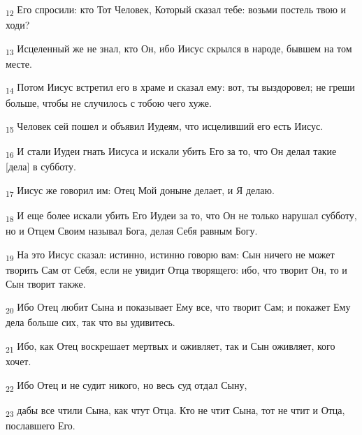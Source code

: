 \begin{tcolorbox}
\textsubscript{12} Его спросили: кто Тот Человек, Который сказал тебе: возьми постель твою и ходи?
\end{tcolorbox}
\begin{tcolorbox}
\textsubscript{13} Исцеленный же не знал, кто Он, ибо Иисус скрылся в народе, бывшем на том месте.
\end{tcolorbox}
\begin{tcolorbox}
\textsubscript{14} Потом Иисус встретил его в храме и сказал ему: вот, ты выздоровел; не греши больше, чтобы не случилось с тобою чего хуже.
\end{tcolorbox}
\begin{tcolorbox}
\textsubscript{15} Человек сей пошел и объявил Иудеям, что исцеливший его есть Иисус.
\end{tcolorbox}
\begin{tcolorbox}
\textsubscript{16} И стали Иудеи гнать Иисуса и искали убить Его за то, что Он делал такие [дела] в субботу.
\end{tcolorbox}
\begin{tcolorbox}
\textsubscript{17} Иисус же говорил им: Отец Мой доныне делает, и Я делаю.
\end{tcolorbox}
\begin{tcolorbox}
\textsubscript{18} И еще более искали убить Его Иудеи за то, что Он не только нарушал субботу, но и Отцем Своим называл Бога, делая Себя равным Богу.
\end{tcolorbox}
\begin{tcolorbox}
\textsubscript{19} На это Иисус сказал: истинно, истинно говорю вам: Сын ничего не может творить Сам от Себя, если не увидит Отца творящего: ибо, что творит Он, то и Сын творит также.
\end{tcolorbox}
\begin{tcolorbox}
\textsubscript{20} Ибо Отец любит Сына и показывает Ему все, что творит Сам; и покажет Ему дела больше сих, так что вы удивитесь.
\end{tcolorbox}
\begin{tcolorbox}
\textsubscript{21} Ибо, как Отец воскрешает мертвых и оживляет, так и Сын оживляет, кого хочет.
\end{tcolorbox}
\begin{tcolorbox}
\textsubscript{22} Ибо Отец и не судит никого, но весь суд отдал Сыну,
\end{tcolorbox}
\begin{tcolorbox}
\textsubscript{23} дабы все чтили Сына, как чтут Отца. Кто не чтит Сына, тот не чтит и Отца, пославшего Его.
\end{tcolorbox}
